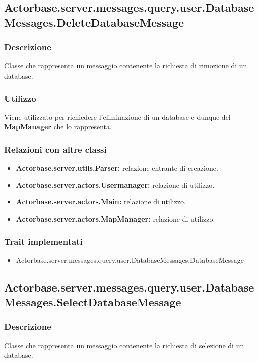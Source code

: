 \documentclass[a4paper]{article}
\begin{document}
		\subsection{Actorbase.server.messages.query.user.DatabaseMessages.DeleteDatabaseMessage}
			\subsubsection{Descrizione}
				Classe che rappresenta un messaggio contenente la richiesta di rimozione di un database.
				
			\subsubsection{Utilizzo}
				Viene utilizzato per richiedere l'eliminazione di un database e dunque del \textbf{MapManager} che lo rappresenta.
				
			\subsubsection{Relazioni con altre classi}
				\begin{itemize}
					\item \textbf{Actorbase.server.utils.Parser:} relazione entrante di creazione.
					\item \textbf{Actorbase.server.actors.Usermanager:} relazione di utilizzo.
					\item \textbf{Actorbase.server.actors.Main:} relazione di utilizzo.
					\item \textbf{Actorbase.server.actors.MapManager:} relazione di utilizzo.
				\end{itemize}
			\subsubsection{Trait implementati}
				\begin{itemize}
					\item Actorbase.server.messages.query.user.DatabaseMessages.DatabaseMessage
				\end{itemize}
				
		\subsection{Actorbase.server.messages.query.user.DatabaseMessages.SelectDatabaseMessage}
			\subsubsection{Descrizione}
				Classe che rappresenta un messaggio contenente la richiesta di selezione di un database.
				
\end{document}
